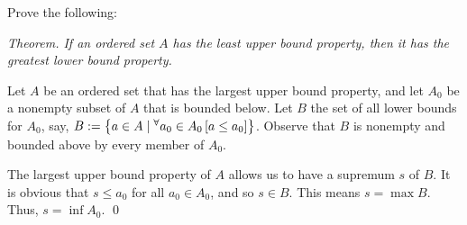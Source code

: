 \documentclass[a4paper,12pt]{article}
\begin{document}
\begin{exe}
	Prove the following:\leavevmode \par
	\noindent\textit{Theorem.
		If an ordered set \( A \) has the least upper bound property,
		then it has the greatest lower bound property.
	}
\end{exe}\begin{sol}%
	Let
	\( A \)
	be an ordered set that has the largest upper bound property,
	and let \( A_0 \) be a nonempty subset of
	\( A \)
	that is bounded below.
	Let \( B \) the set of all lower bounds for
	\( A_0 \), say,
	\( B:=\left\{ a \in A \;|\; {}^{\forall}  a_0 \in A_0 \left[ a \le a_0 \right] \right\} \).
	Observe that
	\( B \)
	is nonempty and bounded above by every member of \( A_0 \).
	
	The largest upper bound property of
	\( A \)
	allows us to have a supremum 
	\( s \)
	of 
	\( B \).
	It is obvious that 
	\( s \le a_0 \)
	for all
	\( a_0 \in A_0 \),
	and so
	\( s \in B \).
	This means
	\( s=\max{B} \).
	Thus,
	\( s=\inf{A_0} \).
	\qed\end{sol}
\end{document}
